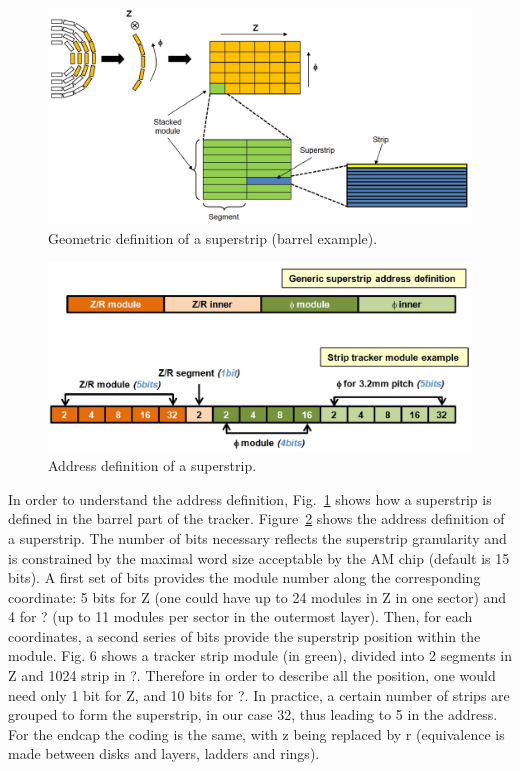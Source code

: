 \begin{figure}[ht!]
\centering
\includegraphics[width=0.8\columnwidth]{Plots/SStripDef.eps}
\caption{Geometric definition of a superstrip (barrel example).}
\label{fig:Det_to_SS}
\end{figure}
\begin{figure}[ht!]
\centering
\includegraphics[width=0.6\columnwidth]{Plots/SSaddress.eps}
\caption{Address definition of a superstrip.}
\label{fig:SS_def}
\end{figure}

\noindent In order to understand the address definition, Fig.~\ref{fig:Det_to_SS} shows how a superstrip is defined in the barrel part of the tracker. Figure~\ref{fig:SS_def} shows the address definition of a superstrip. The number of bits necessary reflects the superstrip granularity and is constrained by the maximal word size acceptable by the AM chip (default is 15 bits). A first set of bits provides the module number along the corresponding coordinate: 5 bits for Z (one could have up to 24 modules in Z in one sector) and 4 for ? (up to 11 modules per sector in the outermost layer). Then, for each coordinates, a second series of bits provide the superstrip position within the module. Fig. 6 shows a tracker strip module (in green), divided into 2 segments in Z and 1024 strip in ?. Therefore in order to describe all the position, one would need only 1 bit for Z, and 10 bits for ?. In practice, a certain number of strips are grouped to form the superstrip, in our case 32, thus leading to 5 in the address. For the endcap the coding is the same, with z being replaced by r (equivalence is made between disks and layers, ladders and rings). 



\clearpage
